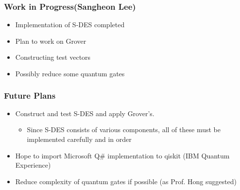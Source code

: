 \documentclass{beamer}
\begin{document}
	\begin{frame}
		\frametitle{Work in Progress(Sangheon Lee)}
		\begin{itemize}
            \item Implementation of S-DES completed
            \item Plan to work on Grover
            \item Constructing test vectors
			\item Possibly reduce some quantum gates
		\end{itemize}
	\end{frame}
	
	\begin{frame}
		\frametitle{Future Plans}
		\begin{itemize}
			\item Construct and test S-DES and apply Grover's.
            \begin{itemize}
                \item Since S-DES consists of various components, all of these must be implemented carefully and in order
            \end{itemize}
            \item Hope to import Microsoft Q\# implementation to qiskit (IBM Quantum Experience)
            \item Reduce complexity of quantum gates if possible (as Prof. Hong suggested)
		\end{itemize}
	\end{frame}
\end{document}
